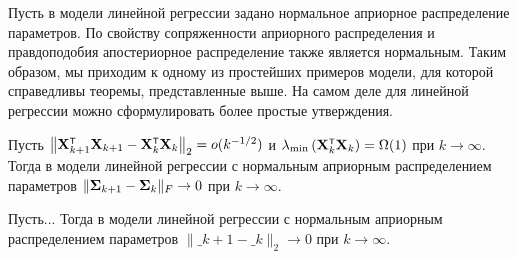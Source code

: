 Пусть в модели линейной регрессии задано нормальное априорное распределение параметров. По свойству сопряженности априорного распределения и правдоподобия апостериорное распределение также является нормальным. Таким образом, мы приходим к одному из простейших примеров модели, для которой справедливы теоремы, представленные выше. На самом деле для линейной регрессии можно сформулировать более простые утверждения.

\begin{theorem}[Киселев, 2024]\label{theorem4}
    Пусть $\left\| \bX\T_{k+1} \bX_{k+1} - \bX\T_k \bX_k \right\|_2 = o(k^{-1/2})$ и $\lambda_{\min}\left( \bX\T_k \bX_k \right) = \Omega(1)$ при $k \to \infty$. Тогда в модели линейной регрессии с нормальным априорным распределением параметров $\| \boldsymbol{\Sigma}_{k+1} - \boldsymbol{\Sigma}_k \|_{F} \to 0$ при $k \to \infty$.
\end{theorem}

\begin{theorem}[Киселев, 2024]\label{theorem5}
    Пусть... Тогда в модели линейной регрессии с нормальным априорным распределением параметров $\| \bm_{k+1} - \bm_k \|_2 \to 0$ при $k \to \infty$.
\end{theorem}